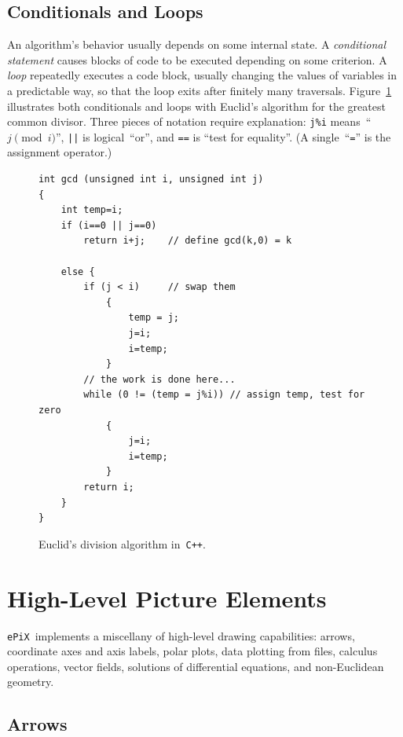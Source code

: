 \documentclass[12pt]{report}
\newcommand{\code}[1]{\texttt{#1}}
\newcommand{\ePiX}{\code{ePiX}}
\newcommand{\CXX}{\code{C++}}
\begin{document}
\subsection*{Conditionals and Loops}

An algorithm's behavior usually depends on some internal state. A
\emph{conditional statement} causes blocks of code to be executed
depending on some criterion. A \emph{loop} repeatedly executes a code
block, usually changing the values of variables in a predictable way,
so that the loop exits after finitely many traversals.
Figure~\ref{fig:gcd} illustrates both conditionals and loops with
Euclid's algorithm for the greatest common divisor. Three pieces of
notation require explanation: \code{j\%i} means~``$j\pmod i$'',
\code{||} is logical~``or'', and \code{==} is ``test for equality''.
(A single~``\code{=}'' is the assignment operator.)
\begin{figure}[hbt]
\begin{footnotesize}
\begin{verbatim}
int gcd (unsigned int i, unsigned int j)
{
    int temp=i;
    if (i==0 || j==0)
        return i+j;    // define gcd(k,0) = k

    else {
        if (j < i)     // swap them
            {
                temp = j;
                j=i;
                i=temp;
            }
        // the work is done here...
        while (0 != (temp = j%i)) // assign temp, test for zero
            {
                j=i;
                i=temp;
            }
        return i;
    }
}
\end{verbatim}
\end{footnotesize}
\caption{Euclid's division algorithm in~\CXX.}
\label{fig:gcd}
\end{figure}



\section{High-Level Picture Elements}

\ePiX\ implements a miscellany of high-level drawing capabilities:
arrows, coordinate axes and axis labels, polar plots, data plotting
from files, calculus operations, vector fields, solutions of
differential equations, and non-Euclidean geometry.


\subsection*{Arrows} 
\end{document}
